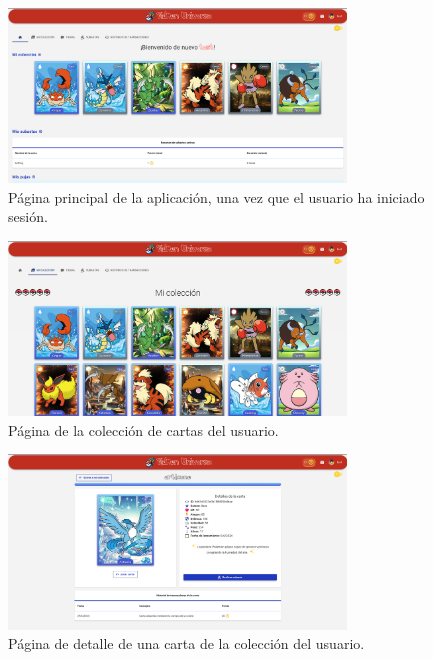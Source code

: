 \begin{figure}[H]
    \centering
    \includegraphics[width=0.8\textwidth]{figures/6-Analisis/6-Interfaz/interfaz/logued.png}
    \caption{Página principal de la aplicación, una vez que el usuario ha iniciado sesión.}
    \label{fig:interfaz-logued}
\end{figure}


\begin{figure}[H]
    \centering
    \includegraphics[width=0.8\textwidth]{figures/6-Analisis/6-Interfaz/interfaz/coleccion.png}
    \caption{Página de la colección de cartas del usuario.}
    \label{fig:interfaz-coleccion}
\end{figure}


\begin{figure}[H]
    \centering
    \includegraphics[width=0.8\textwidth]{figures/6-Analisis/6-Interfaz/interfaz/detalle_carta.png}
    \caption{Página de detalle de una carta de la colección del usuario.}
    \label{fig:interfaz-detalle-carta}
\end{figure}


